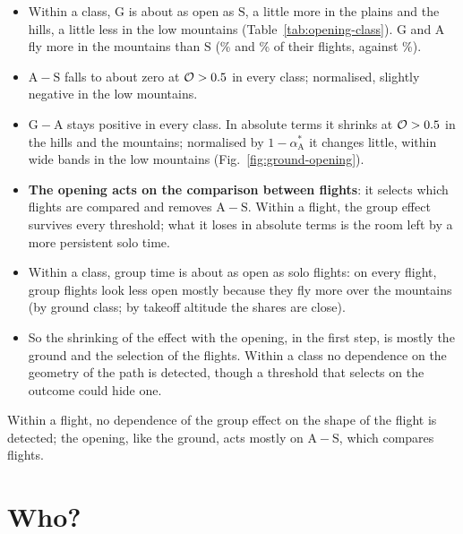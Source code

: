 \documentclass[10pt,a4paper]{article}
\newcommand{\G}{\mathrm{G}}
\newcommand{\A}{\mathrm{A}}
\newcommand{\Sl}{\mathrm{S}}
\newcommand{\Home}{\item[\textcolor{answer}{\textbf{Take home.}}]\color{black}}
\newcommand{\Ded}{\item[\textcolor{answer}{\textbf{Deduction.}}]\color{black}}
\newenvironment{step}{\begin{description}[leftmargin=0pt, itemsep=7pt, topsep=8pt]}{\end{description}}
\begin{document}
\begin{step}
\begin{itemize}
  \item Within a class, $\G$ is about as open as $\Sl$, a little more in the plains and the hills, a little less
    in the low mountains (Table~\ref{tab:opening-class}). $\G$ and $\A$ fly more in the mountains than $\Sl$
    (\GroundMountainG\% and \GroundMountainA\% of their flights, against \GroundMountainS\%).
  \item $\A-\Sl$ falls to about zero at $\mathcal O>0.5$ in every class; normalised, slightly negative in the
    low mountains.
  \item $\G-\A$ stays positive in every class. In absolute terms it shrinks at $\mathcal O>0.5$ in the hills
    and the mountains; normalised by $1-\alpha^*_\A$ it changes little, within wide bands in the low mountains
    (Fig.~\ref{fig:ground-opening}).
  \end{itemize}
\Ded\mbox{}
  \begin{itemize}
  \item \textbf{The opening acts on the comparison between flights}: it selects which flights are compared and
    removes $\A-\Sl$. Within a flight, the group effect survives every threshold; what it loses in absolute terms
    is the room left by a more persistent solo time.
  \item Within a class, group time is about as open as solo flights: on every flight, group flights look less
    open mostly because they fly more over the mountains (by ground class; by takeoff altitude the shares are
    close).
  \item So the shrinking of the effect with the opening, in the first step, is mostly the ground and the
    selection of the flights. Within a class no dependence on the geometry of the path is detected, though a
    threshold that selects on the outcome could hide one.
  \end{itemize}
\Home Within a flight, no dependence of the group effect on the shape of the flight is detected; the opening,
  like the ground, acts mostly on $\A-\Sl$, which compares flights.
\end{step}

\section{Who?}\label{ch:who}
\end{document}
